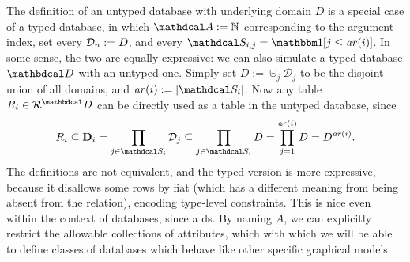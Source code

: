 \documentclass{article}
\begin{document}
\begin{remark}\label{rem:typed-db-better}
    The definition of an untyped database with underlying domain $D$ is a special case of a typed database, in which $\Attrs := \mathbb N$ corresponding to the argument index, set every ${\mathcal D}_n := D $, and every $\sch_{i,j} = \mathbbm1[j \le \arity(i)]$.
    In some sense, the two are equally expressive: we can also simulate a typed database $\D$ with an untyped one. Simply set $D := \uplus_j \mathcal D_j$ to be the disjoint union of all domains, and $\arity(i) := |\sch_i|$. Now any table $R_i \in \Rels^\D$ can be directly used as a table in the untyped database, since
    \[R_i \subseteq \mat D_i = \prod_{j \in \sch_i} \mathcal D_{j}
		\subseteq \prod_{j \in \sch_i} D = \prod_{j = 1}^{\arity(i)} D =
        D^{\arity(i)} .\]
  	The definitions are not equivalent, and the typed version is more expressive, because it disallows some rows by fiat (which has a different meaning from being absent from the relation), encoding type-level constraints. This is nice even within the context of databases, since a ds. By naming $A$, we can explicitly restrict the  allowable collections of attributes, which with which we will be able to define classes of databases which behave like other specific graphical models.
\end{remark}
\end{document}
